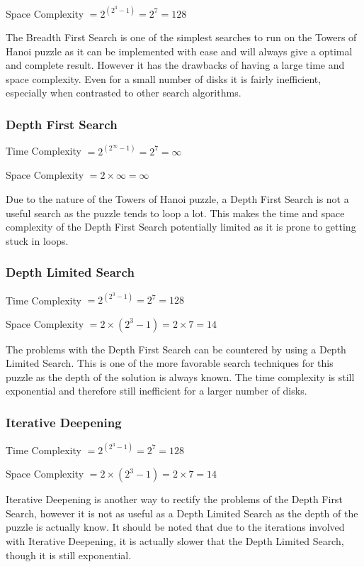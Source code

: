\documentclass[10pt,letterpaper]{article}
\begin{document}
	Space Complexity \(=2^{(2^3-1)} = 2^7 = 128\)
	
	The Breadth First Search is one of the simplest searches to run on the Towers of Hanoi puzzle as it can be implemented with ease and will always give a optimal and complete result.
	However it has the drawbacks of having a large time and space complexity. Even for a small number of disks it is fairly inefficient, especially when contrasted to other search algorithms.
      
      \subsubsection{Depth First Search}
	Time Complexity \(=2^{(2^\infty-1)} = 2^7 = \infty\)
	
	Space Complexity \(=2\times\infty = \infty\)
	
	Due to the nature of the Towers of Hanoi puzzle, a Depth First Search is not a useful search as the puzzle tends to loop a lot. This makes the time and space complexity of the Depth First Search potentially limited as it is prone to getting stuck in loops.
      
      \subsubsection{Depth Limited Search}
	Time Complexity \(=2^{(2^3-1)} = 2^7 = 128\)
	
	Space Complexity \(= 2\times(2^3-1) = 2\times7 = 14\)
	
	The problems with the Depth First Search can be countered by using a Depth Limited Search. This is one of the more favorable search techniques for this puzzle as the depth of the solution is always known.
	The time complexity is still exponential and therefore still inefficient for a larger number of disks.
      
      \subsubsection{Iterative Deepening}
	Time Complexity \(=2^{(2^3-1)} = 2^7 = 128\)
	
	Space Complexity \(= 2\times(2^3-1) = 2\times7 = 14\)
	
	Iterative Deepening is another way to rectify the problems of the Depth First Search, however it is not as useful as a Depth Limited Search as the depth of the puzzle is actually know.
	It should be noted that due to the iterations involved with Iterative Deepening, it is actually slower that the Depth Limited Search, though it is still exponential.
      
\end{document}
